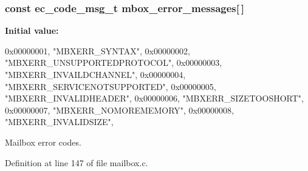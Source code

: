 \subsubsection[{mbox\-\_\-error\-\_\-messages}]{\setlength{\rightskip}{0pt plus 5cm}const {\bf ec\-\_\-code\-\_\-msg\-\_\-t} {\bf mbox\-\_\-error\-\_\-messages}[$\,$]}\label{mailbox_8c_a38d51351bd6f8415a033c027c5e39a3a}
{\bfseries \-Initial value\-:}
\begin{DoxyCode}
 {
    {0x00000001, "MBXERR_SYNTAX"},
    {0x00000002, "MBXERR_UNSUPPORTEDPROTOCOL"},
    {0x00000003, "MBXERR_INVAILDCHANNEL"},
    {0x00000004, "MBXERR_SERVICENOTSUPPORTED"},
    {0x00000005, "MBXERR_INVALIDHEADER"},
    {0x00000006, "MBXERR_SIZETOOSHORT"},
    {0x00000007, "MBXERR_NOMOREMEMORY"},
    {0x00000008, "MBXERR_INVALIDSIZE"},
    {}
}
\end{DoxyCode}


\-Mailbox error codes. 



\-Definition at line 147 of file mailbox.\-c.

